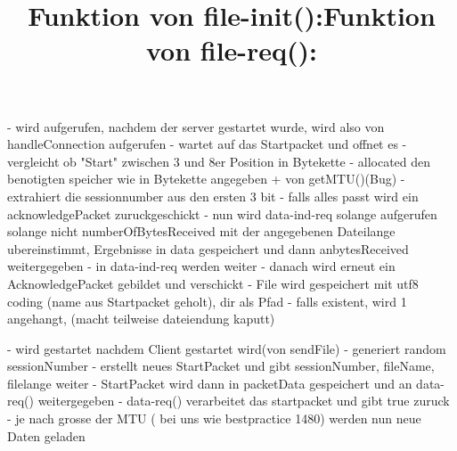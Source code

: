 \documentclass [12pt]{article}
\begin{document}
\title{Funktion von file-init():}
\maketitle
\newline\newline
- wird aufgerufen, nachdem der server gestartet wurde, wird also von handleConnection aufgerufen\newline
- wartet auf das Startpacket und offnet es\newline
- vergleicht ob "Start" zwischen 3 und 8er Position in Bytekette\newline
- allocated den benotigten speicher wie in Bytekette angegeben + von getMTU()(Bug)\newline
- extrahiert die sessionnumber aus den ersten 3 bit\newline
- falls alles passt wird ein acknowledgePacket zuruckgeschickt\newline
- nun wird data-ind-req solange aufgerufen solange nicht numberOfBytesReceived mit der angegebenen Dateilange ubereinstimmt, Ergebnisse in data gespeichert und dann an\newline bytesReceived weitergegeben\newline
- in data-ind-req werden weiter \newline
- danach wird erneut ein AcknowledgePacket gebildet und verschickt\newline
- File wird gespeichert mit utf8 coding (name aus Startpacket geholt), dir als Pfad\newline
- falls existent, wird 1 angehangt, (macht teilweise dateiendung kaputt)\newline
\title{Funktion von file-req():}
\maketitle
\newline\newline
- wird gestartet nachdem Client gestartet wird(von sendFile)\newline
- generiert random sessionNumber\newline
- erstellt neues StartPacket und gibt sessionNumber, fileName, filelange weiter\newline
- StartPacket wird dann in packetData gespeichert und an data-req() weitergegeben\newline
- data-req() verarbeitet das startpacket und gibt true zuruck\newline
- je nach grosse der MTU ( bei uns wie bestpractice 1480) werden nun neue Daten geladen\newline
\end{document}
